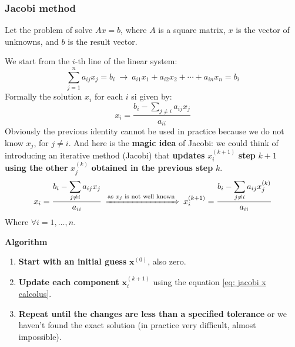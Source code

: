 \subsubsection{Jacobi method}

Let the problem of solve $Ax = b$, where $A$ is a square matrix, $x$ is the vector of unknowns, and $b$ is the result vector.

\highspace
We start from the $i$-th line of the linear system:
\begin{equation*}
    \displaystyle\sum_{j = 1}^{n} a_{ij}x_{j} = b_{i} \: \rightarrow \: a_{i1}x_{1} + a_{i2}x_{2} + \cdots + a_{in}x_{n} = b_{i}
\end{equation*}
Formally the solution $x_{i}$ for each $i$ si given by:
\begin{equation}
    x_{i} = \dfrac{b_{i}-\displaystyle\sum_{j \ne i} a_{ij}x_{j}}{a_{ii}}
\end{equation}
Obviously the previous identity cannot be used in practice because we do not know $x_{j}$, for $j \ne i$. And here is the \textbf{magic idea} of Jacobi: we could think of introducing an iterative method (Jacobi) that \textbf{updates} $x_{i}^{\left(k+1\right)}$ \textbf{step} $k+1$ \textbf{using the other} $x_{j}^{\left(k\right)}$ \textbf{obtained in the previous step} $k$.
\begin{equation}\label{eq: jacobi x calcolus}
    x_{i} = \dfrac{b_{i}-\displaystyle\sum_{j \ne i} a_{ij}x_{j}}{a_{ii}} \: \xRightarrow{\text{as }x_{j}\text{ is not well known}} \: x_{i}^{\left(k+1\right)} = \dfrac{b_{i}-\displaystyle\sum_{j \ne i} a_{ij}x_{j}^{\left(k\right)}}{a_{ii}}
\end{equation}
Where $\forall i = 1, \dots, n$.

\highspace
\begin{flushleft}
    \textcolor{Green3}{ \textbf{Algorithm}}
\end{flushleft}
\begin{enumerate}
    \item \textbf{Start with an initial guess} $\mathbf{x}^{\left(0\right)}$, also zero.
    \item \textbf{Update each component} $\mathbf{x}_{i}^{\left(k+1\right)}$ using the equation \ref{eq: jacobi x calcolus}.
    \item \textbf{Repeat until the changes are less than a specified tolerance} or we haven't found the exact solution (in practice very difficult, almost impossible).
\end{enumerate}


